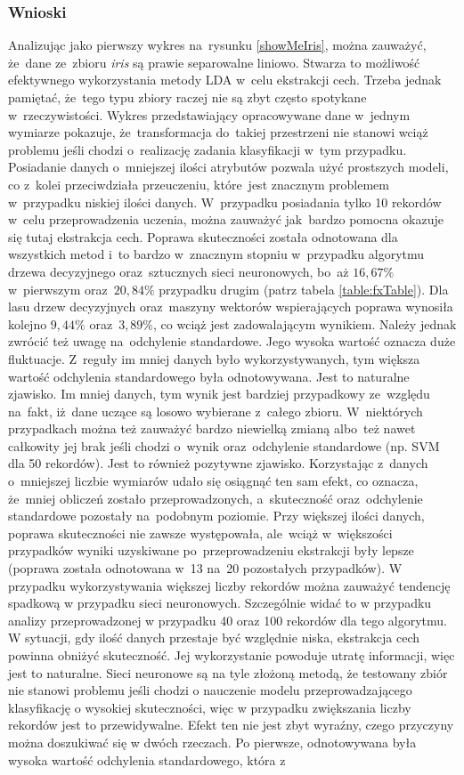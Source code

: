 \subsubsection{Wnioski}
Analizując jako pierwszy wykres na~rysunku \ref{showMeIris}, można zauważyć, że~dane ze~zbioru \textit{iris} są prawie separowalne liniowo. Stwarza to możliwość efektywnego wykorzystania metody LDA w~celu ekstrakcji cech. Trzeba jednak pamiętać, że~tego typu zbiory raczej nie są zbyt często spotykane w~rzeczywistości. Wykres przedstawiający opracowywane dane w~jednym wymiarze pokazuje, że~transformacja do~takiej przestrzeni nie stanowi wciąż problemu jeśli chodzi o~realizację zadania klasyfikacji w~tym przypadku. Posiadanie danych o~mniejszej ilości atrybutów pozwala użyć prostszych modeli, co z~kolei przeciwdziała przeuczeniu, które~jest znacznym problemem w~przypadku niskiej ilości danych. W~przypadku posiadania tylko 10 rekordów w~celu przeprowadzenia uczenia, można zauważyć jak~bardzo pomocna okazuje się tutaj ekstrakcja cech. Poprawa skuteczności została odnotowana dla wszystkich metod i~to bardzo w~znacznym stopniu w~przypadku algorytmu drzewa decyzyjnego oraz~sztucznych sieci neuronowych, bo~aż $16,67 \%$ w~pierwszym oraz~$20,84 \%$ przypadku drugim (patrz tabela \ref{table:fxTable}). Dla lasu drzew decyzyjnych oraz~maszyny wektorów wspierających poprawa wynosiła kolejno $9,44 \%$ oraz~$3,89 \%$, co wciąż jest zadowalającym wynikiem.  Należy jednak zwrócić też uwagę na~odchylenie standardowe. Jego wysoka wartość oznacza duże fluktuacje. Z~reguły im mniej danych było wykorzystywanych, tym większa wartość odchylenia standardowego była odnotowywana. Jest to naturalne zjawisko. Im mniej danych, tym wynik jest bardziej przypadkowy ze~względu na~fakt, iż~dane uczące są losowo wybierane z~całego zbioru. W~niektórych przypadkach można też zauważyć bardzo niewielką zmianą albo~też nawet całkowity jej brak jeśli chodzi o~wynik oraz~odchylenie standardowe (np. SVM dla 50 rekordów). Jest to również pozytywne zjawisko. Korzystając z~danych o~mniejszej liczbie wymiarów udało się osiągnąć ten sam efekt, co oznacza, że~mniej obliczeń zostało przeprowadzonych, a~skuteczność oraz~odchylenie standardowe pozostały na~podobnym poziomie. Przy większej ilości danych, poprawa skuteczności nie zawsze występowała, ale~wciąż w~większości przypadków wyniki uzyskiwane po~przeprowadzeniu ekstrakcji były lepsze (poprawa została odnotowana w~13 na~20 pozostałych przypadków).  W przypadku wykorzystywania większej liczby rekordów można zauważyć tendencję spadkową w przypadku sieci neuronowych. Szczególnie widać to w przypadku analizy przeprowadzonej w przypadku 40 oraz 100 rekordów dla tego algorytmu. W sytuacji, gdy ilość danych przestaje być względnie niska, ekstrakcja cech powinna obniżyć skuteczność. Jej wykorzystanie powoduje utratę informacji, więc jest to naturalne. Sieci neuronowe są na tyle złożoną metodą, że testowany zbiór nie stanowi problemu jeśli chodzi o nauczenie modelu przeprowadzającego klasyfikację o wysokiej skuteczności, więc w przypadku zwiększania liczby rekordów jest to przewidywalne. Efekt ten nie jest zbyt wyraźny, czego przyczyny można doszukiwać się w dwóch rzeczach. Po pierwsze, odnotowywana była wysoka wartość odchylenia standardowego, która z 